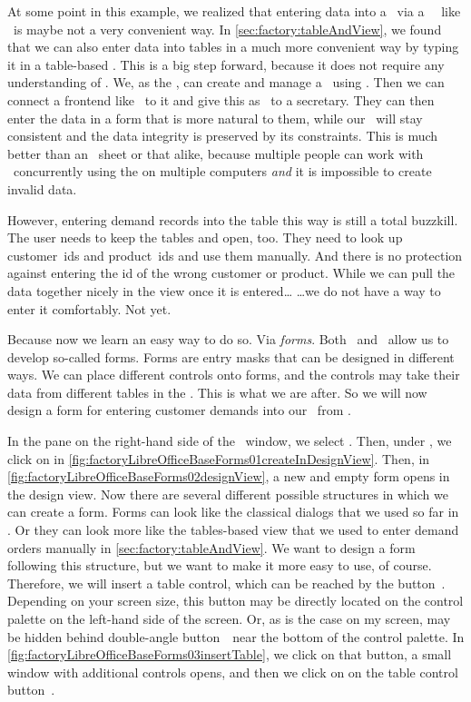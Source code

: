 %
%
At some point in this example, we realized that entering data into a \db\ via a \sql\ \client\ like \psql\ is maybe not a very convenient way.
In \cref{sec:factory:tableAndView}, we found that we can also enter data into tables in a much more convenient way by typing it in a table-based .
This is a big step forward, because it does not require any understanding of \sql.
We, as the , can create and manage a \db\ using \sql.
Then we can connect a frontend like \libreofficeBase\ to it and give this as \client\ to a secretary.
They can then enter the data in a form that is more natural to them, while our \db\ will stay consistent and the data integrity is preserved by its constraints.
This is much better than an \microsoftExcel\ sheet or that alike, because multiple people can work with \db\ concurrently using the  on multiple computers \emph{and} it is impossible to create invalid data.

However, entering demand records into the  table this way is still a total buzzkill.
The user needs to keep the tables  and  open, too.
They need to look up customer~ids and product~ids and use them manually.
And there is no protection against entering the id of the wrong customer or product.
While we can pull the data together nicely in the view  once it is entered{\dots}
{\dots}we do not have a way to enter it comfortably.
Not yet.

Because now we learn an easy way to do so.
Via \emph{forms}.
Both \microsoftAccess\ and \libreofficeBase\ allow us to develop so-called forms.
Forms are entry masks that can be designed in different ways.
We can place different controls onto forms, and the controls may take their data from different tables in the \db.
This is what we are after.
So we will now design a form for entering customer demands into our \db\ from \libreofficeBase.

In the  pane on the right-hand side of the \libreofficeBase\ window, we select .
Then, under , we  click on  in \cref{fig:factoryLibreOfficeBaseForms01createInDesignView}.
Then, in \cref{fig:factoryLibreOfficeBaseForms02designView}, a new and empty form opens in the design view.
Now there are several different possible structures in which we can create a form.
Forms can look like the classical dialogs that we used so far in \libreoffice.
Or they can look more like the tables-based view that we used to enter demand orders manually in \cref{sec:factory:tableAndView}.
We want to design a form following this structure, but we want to make it more easy to use, of course.
Therefore, we will insert a table control, which can be reached by the button~\libreOfficeBaseTable.
Depending on your screen size, this button may be directly located on the control palette on the left-hand side of the screen.
Or, as is the case on my screen, may be hidden behind double-angle button~\libreOfficeBaseMore\ near the bottom of the control palette.
In \cref{fig:factoryLibreOfficeBaseForms03insertTable}, we click on that button, a small window with additional controls opens, and then we click on on the table control button~\libreOfficeBaseTable.

